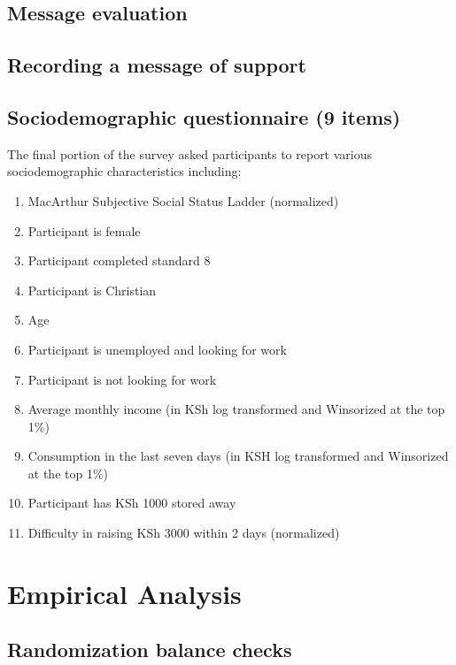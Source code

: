 \documentclass[11pt, a4paper]{article}\usepackage[]{graphicx}\usepackage[]{color}
\begin{document}
    \subsection{Message evaluation}
    \subsection{Recording a message of support}
    \subsection{Sociodemographic questionnaire (9 items)}

        The final portion of the survey asked participants to report various sociodemographic characteristics including:

        \begin{enumerate}
        \itemsep0em 
            \item MacArthur Subjective Social Status Ladder (normalized)
            \item Participant is female
            \item Participant completed standard 8
            \item Participant is Christian
            \item Age
            \item Participant is unemployed and looking for work
            \item Participant is not looking for work
            \item Average monthly income (in KSh log transformed and Winsorized at the top 1\%)
            \item Consumption in the last seven days (in KSH log transformed and Winsorized at the top 1\%)
            \item Participant has KSh 1000 stored away
            \item Difficulty in raising KSh 3000 within 2 days (normalized)
        \end{enumerate}

\section{Empirical Analysis}

    \subsection{Randomization balance checks}
\end{document}
